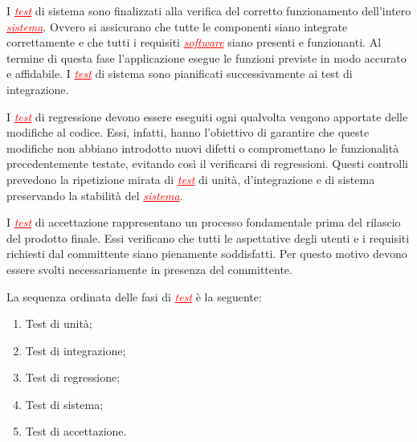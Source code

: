 I \textcolor{red}{\uline{\textit{test}}} di sistema sono finalizzati alla verifica del corretto funzionamento dell'intero \textcolor{red}{\uline{\textit{sistema}}}.
Ovvero si assicurano che tutte le componenti siano integrate correttamente e che tutti i requisiti \textcolor{red}{\uline{\textit{software}}}
siano presenti e funzionanti. Al termine di questa fase l'applicazione esegue le funzioni previste in modo accurato e affidabile.
I \textcolor{red}{\uline{\textit{test}}} di sistema sono pianificati successivamente ai test di integrazione.

I \textcolor{red}{\uline{\textit{test}}} di regressione devono essere eseguiti ogni qualvolta vengono apportate delle modifiche al codice.
Essi, infatti, hanno l'obiettivo di garantire che queste modifiche non abbiano introdotto nuovi difetti o compromettano le funzionalità
precedentemente testate, evitando così il verificarsi di regressioni. Questi controlli prevedono la ripetizione mirata di 
\textcolor{red}{\uline{\textit{test}}} di unità, d'integrazione e di sistema preservando la stabilità del \textcolor{red}{\uline{\textit{sistema}}}.

I \textcolor{red}{\uline{\textit{test}}} di accettazione rappresentano un processo fondamentale prima del rilascio del prodotto finale.
Essi verificano che tutti le aspettative degli utenti e i requisiti richiesti dal committente siano pienamente soddisfatti. Per questo motivo
devono essere svolti necessariamente in presenza del committente.

La sequenza ordinata delle fasi di \textcolor{red}{\uline{\textit{test}}} è la seguente:
\begin{enumerate}
    \item Test di unità;
    \item Test di integrazione;
    \item Test di regressione;
    \item Test di sistema;
    \item Test di accettazione.
\end{enumerate}

